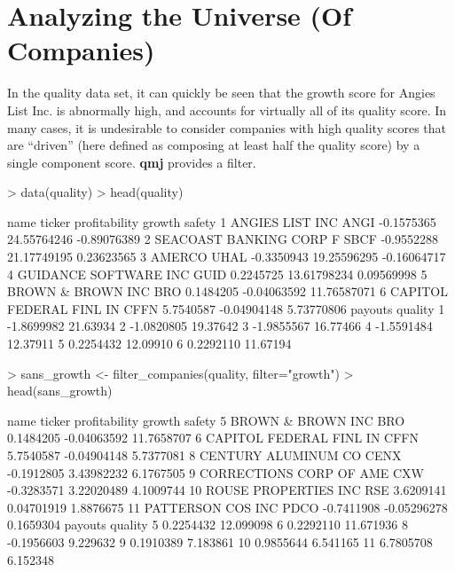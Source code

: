 \documentclass[titlepage]{article}
\begin{document}
\section*{Analyzing the Universe (Of Companies)}
In the quality data set, it can quickly be seen that the growth score for Angies List Inc. is abnormally high, and accounts for virtually all of its quality score. In many cases, it is undesirable to consider companies with high quality scores that are ``driven'' (here defined as composing at least half the quality score) by a single component score. \textbf{qmj} provides a filter.

\begin{Schunk}
\begin{Sinput}
> data(quality)
> head(quality)
\end{Sinput}
\begin{Soutput}
                     name ticker profitability      growth      safety
1         ANGIES LIST INC   ANGI    -0.1575365 24.55764246 -0.89076389
2 SEACOAST BANKING CORP F   SBCF    -0.9552288 21.17749195  0.23623565
3                  AMERCO   UHAL    -0.3350943 19.25596295 -0.16064717
4   GUIDANCE SOFTWARE INC   GUID     0.2245725 13.61798234  0.09569998
5       BROWN & BROWN INC    BRO     0.1484205 -0.04063592 11.76587071
6 CAPITOL FEDERAL FINL IN   CFFN     5.7540587 -0.04904148  5.73770806
     payouts  quality
1 -1.8699982 21.63934
2 -1.0820805 19.37642
3 -1.9855567 16.77466
4 -1.5591484 12.37911
5  0.2254432 12.09910
6  0.2292110 11.67194
\end{Soutput}
\begin{Sinput}
> sans_growth <- filter_companies(quality, filter="growth")
> head(sans_growth)
\end{Sinput}
\begin{Soutput}
                      name ticker profitability      growth     safety
5        BROWN & BROWN INC    BRO     0.1484205 -0.04063592 11.7658707
6  CAPITOL FEDERAL FINL IN   CFFN     5.7540587 -0.04904148  5.7377081
8      CENTURY ALUMINUM CO   CENX    -0.1912805  3.43982232  6.1767505
9  CORRECTIONS CORP OF AME    CXW    -0.3283571  3.22020489  4.1009744
10    ROUSE PROPERTIES INC    RSE     3.6209141  0.04701919  1.8876675
11       PATTERSON COS INC   PDCO    -0.7411908 -0.05296278  0.1659304
      payouts   quality
5   0.2254432 12.099098
6   0.2292110 11.671936
8  -0.1956603  9.229632
9   0.1910389  7.183861
10  0.9855644  6.541165
11  6.7805708  6.152348
\end{Soutput}
\end{Schunk}
\end{document}
